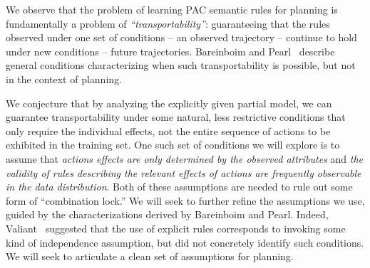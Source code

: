\documentclass[12pt]{article}
\begin{document}
We observe that the problem of learning PAC semantic rules for planning is fundamentally a problem of {\em ``transportability''}: guaranteeing that the rules observed under one set of conditions -- an observed trajectory -- continue to hold under new conditions -- future trajectories. Bareinboim and Pearl~\cite{bareinboim2012completeness,bareinboim2013algorithm} describe general conditions characterizing when such transportability is possible, but not in the context of planning. 


We conjecture that by analyzing the explicitly given partial model, we can guarantee transportability under some natural, less restrictive conditions that only require the individual effects, not the entire sequence of actions to be exhibited in the training set. 
One such set of conditions we will explore is to assume that {\em actions effects are only determined by the observed attributes} and {\em the validity of rules describing the relevant effects of actions are frequently observable in the data distribution}. Both of these assumptions are needed to rule out some form of ``combination lock.'' We will seek to further refine the assumptions we use, guided by the characterizations derived by Bareinboim and Pearl. Indeed, Valiant~\cite{valiant2006knowledgeInfusion} suggested that the use of explicit rules corresponds to invoking some kind of independence assumption, but did not concretely identify such conditions. We will seek to articulate a clean set of assumptions for planning.




\end{document}
